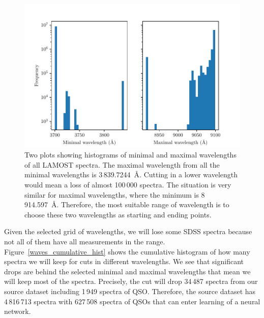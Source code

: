 \begin{figure}
\includegraphics[width=\textwidth]{img/wavemin_wavemax_hist.pdf}
\caption[Minimal and maximal wavelength of LAMOST DR5]{
	Two plots showing histograms of minimal and maximal wavelengths
	of all LAMOST spectra.
	The maximal wavelength from all the minimal wavelengths
	is 3\,839.7244~\AA{}.
	Cutting in a lower wavelength
	would mean a loss of almost 100\,000 spectra.
	The situation is very similar for maximal wavelengths,
	where the minimum is 8\,914.597~\AA{}.
	Therefore, the most suitable range of wavelength is to choose
	these two wavelengths as starting and ending points.
	}
\label{wavemin_wavemax_hist}
\end{figure}

Given the selected grid of wavelengths,
we will lose some SDSS spectra because not all of them have all measurements in the range.
Figure~\ref{waves_cumulative_hist} shows the cumulative histogram of how many spectra we will keep for cuts in different wavelengths.
We see that significant drops are behind the selected minimal and maximal wavelengths
that mean we will keep most of the spectra.
Precisely, the cut will drop 34\,487 spectra from our source dataset
including 1\,949 spectra of QSO.
Therefore, the source dataset has 4\,816\,713 spectra with 627\,508 spectra of QSOs that can enter learning of a neural network.

